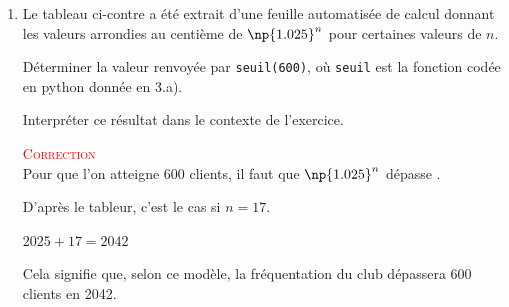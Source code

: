 \begin{enumerate}
\begin{enumerate}
	\item
\begin{minipage}[t]{0.45\linewidth}\vspace{0mm}
Le tableau ci-contre a été extrait d'une feuille automatisée de calcul donnant les valeurs arrondies au centième de \mbox{$\np{1.025}^n$} pour certaines valeurs de $n$.

	\vspace{5mm}
	Déterminer la valeur renvoyée par \texttt{seuil(600)}, où \texttt{seuil} est la fonction codée en python donnée en 3.a).


		\vspace{5mm}
	Interpréter ce résultat dans le contexte de l'exercice.


		\vspace{5mm}
				\textcolor{red}{\textsc{Correction}}\\

				Pour que l'on atteigne 600 clients, il faut que \mbox{$\np{1.025}^n$} dépasse .

				D'après le tableur, c'est le cas si \mbox{$n=17$}.

				$2025 + 17 = 2042$

				\vspace{5mm}
				Cela signifie que, selon ce modèle, la fréquentation du club dépassera 600 clients en 2042.
\end{minipage}\hspace{0.05\linewidth}\begin{minipage}[t]{0.35\linewidth}\vspace{0mm}


\end{minipage}
\end{enumerate}
\end{enumerate}
